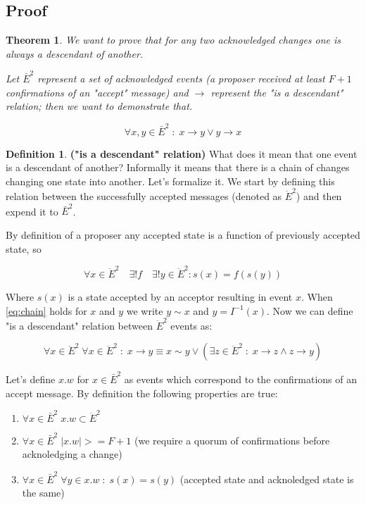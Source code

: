 \documentclass[12pt]{article}
\newtheorem{theorem}{Theorem}
\theoremstyle{definition}
\newtheorem*{definition}{Definition}
\begin{document}
\begin{appendices}
\section{Proof}
\label{appendix:proof}

\begin{theorem} \label{th:proof}
  We want to prove that for any two acknowledged changes one is always a descendant of another.
  
  Let $\bar{E}^2$ represent a set of acknowledged events (a proposer received at least $F+1$ confirmations of an "accept" message) and $\to$ represent the "is a descendant" relation; then we want to demonstrate that.

  \begin{equation}
    \forall x,y \in \bar{E}^2 \;:\; x \to y \lor y \to x
  \end{equation}
\end{theorem}

\theoremstyle{definition}
\begin{definition}{\bf("is a descendant" relation)}
  What does it mean that one event is a descendant of another? Informally it means that there is a chain of changes changing one state into another. Let's formalize it. We start by defining this relation between the successfully accepted messages (denoted as $\ddot{E}^2$) and then expend it to $\bar{E}^2$.

  By definition of a proposer any accepted state is a function of previously accepted state, so
  
  \begin{equation} \label{eq:chain}
    \forall x \in \ddot{E}^2 \quad \exists ! f \quad \exists ! y \in \ddot{E}^2 : s(x) = f(s(y))
  \end{equation}
  
  Where $s(x)$ is a state accepted by an acceptor resulting in event $x$. When \ref{eq:chain} holds for $x$ and $y$ we write $y \sim x$ and $y = I^{-1}(x)$. Now we can define "is a descendant" relation between $\ddot{E}^2$ events as:
  
  \begin{equation}
    \forall x \in \ddot{E}^2 \; \forall x \in \ddot{E}^2 \;:\; x \to y \equiv x \sim y \lor (\exists z \in \ddot{E}^2 \;:\; x \to z \land z \to y)
  \end{equation}
  
  Let's define $x.w$ for $x \in \bar{E}^2$ as events which correspond to the confirmations of an accept message. By definition the following properties are true:
  \begin{enumerate}
    \item $\forall x \in \bar{E}^2 \; x.w \subset \ddot{E}^2$
    \item $\forall x \in \bar{E}^2 \; |x.w| >= F+1$ (we require a quorum of confirmations before acknoledging a change)
    \item $\forall x \in \bar{E}^2 \; \forall y \in x.w \;:\; s(x) = s(y)$ (accepted state and acknoledged state is the same)
  \end{enumerate}
  

\end{definition}
\end{appendices}
\end{document}
